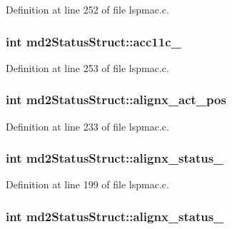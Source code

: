 Definition at line 252 of file lspmac.c.\hypertarget{structmd2StatusStruct_ac7029100738dcc3f09a8b0d1d3d1d353}{
\subsubsection[{acc11c\_\-6}]{\setlength{\rightskip}{0pt plus 5cm}int {\bf md2StatusStruct::acc11c\_}}}
\label{structmd2StatusStruct_ac7029100738dcc3f09a8b0d1d3d1d353}


Definition at line 253 of file lspmac.c.\hypertarget{structmd2StatusStruct_a9653a75bc0b66c5f86d8b0206dc39b4f}{
\subsubsection[{alignx\_\-act\_\-pos}]{\setlength{\rightskip}{0pt plus 5cm}int {\bf md2StatusStruct::alignx\_\-act\_\-pos}}}
\label{structmd2StatusStruct_a9653a75bc0b66c5f86d8b0206dc39b4f}


Definition at line 233 of file lspmac.c.\hypertarget{structmd2StatusStruct_a56accf8cb00c59bff87ed75df7dafbbe}{
\subsubsection[{alignx\_\-status\_\-1}]{\setlength{\rightskip}{0pt plus 5cm}int {\bf md2StatusStruct::alignx\_\-status\_}}}
\label{structmd2StatusStruct_a56accf8cb00c59bff87ed75df7dafbbe}


Definition at line 199 of file lspmac.c.\hypertarget{structmd2StatusStruct_a2feb35ceab8129fd2cc34d1104af8b8f}{
\subsubsection[{alignx\_\-status\_\-2}]{\setlength{\rightskip}{0pt plus 5cm}int {\bf md2StatusStruct::alignx\_\-status\_}}}
\label{structmd2StatusStruct_a2feb35ceab8129fd2cc34d1104af8b8f}


